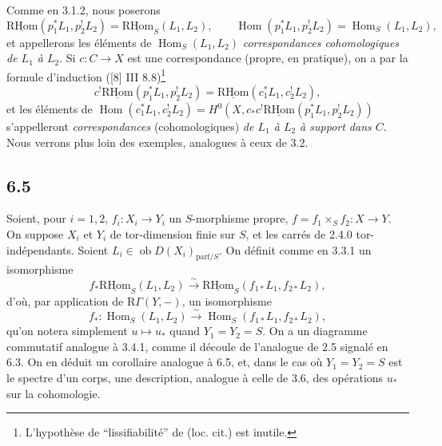 \documentclass[11pt]{article}
\DeclareMathOperator{\Hom}{Hom}
\newcommand{\R}{\mathrm{R}}\newcommand{\RHomCore}{\mathrm{RHom}}
\providecommand{\RHom}{\RHomCore}
\providecommand{\uRHom}{\underline{\RHom}}
\providecommand{\RHom}{\RHomCore}
\providecommand{\Hom}{\operatorname{Hom}}
\providecommand{\RHom}{\R\mathcal{H}om}
\providecommand{\R}{\mathrm R}
\providecommand{\RHom}{\RHomCore}
\providecommand{\Hom}{\operatorname{Hom}}
\begin{document}
Comme en 3.1.2, nous poserons
\begin{equation}
\tag{6.4.3}
\uRHom(p_1^*L_1,p_2^!L_2)=\uRHom_S(L_1,L_2),\qquad
\Hom(p_1^*L_1,p_2^!L_2)=\Hom_S(L_1,L_2),
\end{equation}
et appellerons les éléments de $\Hom_S(L_1,L_2)$ \emph{correspondances cohomologiques de $L_1$ à $L_2$}. Si $c:C\to X$ est une correspondance (propre, en pratique), on a par la formule d'induction ([8] III 8.8)\footnote{L'hypothèse de ``lissifiabilité'' de (loc. cit.) est inutile.}
\begin{equation}
\tag{6.4.4}
c^!\uRHom(p_1^*L_1,p_2^!L_2)=\uRHom(c_1^*L_1,c_2^!L_2),
\end{equation}
et les
éléments de $\Hom(c_1^*L_1,c_2^!L_2)=H^0(X,c_*c^!\uRHom(p_1^*L_1,p_2^!L_2))$ s'appelleront \emph{correspondances} (cohomologiques) \emph{de $L_1$ à $L_2$ à support dans $C$}. Nous verrons plus loin des exemples, analogues à ceux de 3.2.

\subsection*{6.5}
Soient, pour $i=1,2$, $f_i:X_i\to Y_i$ un $S$-morphisme propre, $f=f_1\times_Sf_2:X\to Y$. On suppose $X_i$ et $Y_i$ de tor-dimension finie sur $S$, et les carrés de 2.4.0 tor-indépendants. Soient $L_i\in\operatorname{ob}D(X_i)_{\mathrm{parf}/S}$. On définit comme en 3.3.1 un isomorphisme
\begin{equation}
\tag{6.5.1}
f_*\uRHom_S(L_1,L_2)\xrightarrow{\sim}\uRHom_S(f_{1*}L_1,f_{2*}L_2),
\end{equation}
d'où, par application de $\mathrm{R}\Gamma(Y,-)$, un isomorphisme
\begin{equation}
\tag{6.5.2}
f_*:\Hom_S(L_1,L_2)\xrightarrow{\sim}\Hom_S(f_{1*}L_1,f_{2*}L_2),
\end{equation}
qu'on notera simplement $u\mapsto u_*$ quand $Y_1=Y_2=S$. On a un diagramme commutatif analogue à 3.4.1, comme il découle de l'analogue de 2.5 signalé en 6.3. On en déduit un corollaire analogue à 6.5, et, dans le cas où $Y_1=Y_2=S$ est le spectre d'un corps, une description, analogue à celle de 3.6, des opérations $u_*$ sur la cohomologie.
\end{document}

